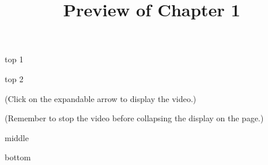 \documentclass{ximera}
\title{Preview of Chapter 1}
\begin{document}
\begin{abstract}
\end{abstract}

\maketitle



top 1


top 2

\begin{explanation}
 (Click on the expandable arrow to display the video.)

\begin{expandable}

\begin{center}
\end{center}

(Remember to stop the video before collapsing the display on the page.)


\end{expandable}

\end{explanation}

middle





bottom
\end{document}
